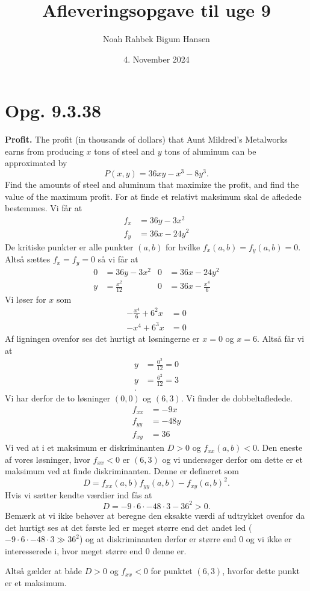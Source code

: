 \documentclass[12pt]{article}
\title{Afleveringsopgave til uge 9}
\author{Noah Rahbek Bigum Hansen}
\date{4. November 2024}
\theoremstyle{definition}
\begin{document}
\maketitle

\section*{Opg. 9.3.38}
\textbf{Profit.} The profit (in thousands of dollars) that Aunt Mildred's Metalworks earns from producing $x$ tons of steel and $y$ tons of aluminum can be approximated by
\[ 
P(x,y) = 36xy - x^3 - 8y^3
.\]
Find the amounts of steel and aluminum that maximize the profit, and find the value of the maximum profit.
\bigbreak
For at finde et relativt maksimum skal de afledede bestemmes. Vi får at
\begin{align*}
  f_{x} &= 36y - 3x^2 \\
  f_y &= 36x - 24y^2
\end{align*}
De kritiske punkter er alle punkter $(a,b)$ for hvilke $f_x(a,b) = f_y(a,b) = 0$. Altså sættes $f_x = f_y = 0$ så vi får at
\begin{align*}
  0 &= 36y - 3x^2 & 0 &= 36x-24y^2 \\
  y &= \frac{x^2}{12} & 0 &= 36x - \frac{x^4}{6} 
\end{align*}
Vi løser for $x$ som
\begin{align*}
  - \frac{x^4}{6} + 6^2x &= 0 \\
  - x^4 + 6^3 x &= 0
\end{align*}
Af ligningen ovenfor ses det hurtigt at løsningerne er $x = 0$ og $x = 6$.
Altså får vi at
\begin{align*}
y &= \frac{0^2}{12} = 0\\
y &= \frac{6^2}{12} = 3 \\
.\end{align*}
Vi har derfor de to løsninger $(0,0)$ og $(6,3)$.
Vi finder de dobbeltafledede.
\begin{align*}
  f_{x x} &= -9x \\
  f_{yy} &= -48y \\
  f_{xy} &= 36
\end{align*}
Vi ved at i et maksimum er diskriminanten $D>0$ og $f_{x x}(a,b) < 0$. Den eneste af vores løsninger, hvor $f_{x x} < 0$ er $(6, 3)$ og vi undersøger derfor om dette er et maksimum ved at finde diskriminanten. Denne er defineret som
\[ 
D = f_{x x}(a,b)f_{yy}(a,b) - f_{xy}(a,b)^2 
.\]
Hvis vi sætter kendte værdier ind fås at
\[ 
D = -9\cdot6\cdot-48\cdot3 - 36^2 > 0
.\]
Bemærk at vi ikke behøver at beregne den eksakte værdi af udtrykket ovenfor da det hurtigt ses at det første led er meget større end det andet led ($-9\cdot6\cdot-48\cdot3 \gg 36^2$) og at diskriminanten derfor er større end 0 og vi ikke er interesserede i, hvor meget større end 0 denne er.

Altså gælder at både $D> 0$ og $f_{x x} < 0$ for punktet $(6,3)$, hvorfor dette punkt er et maksimum.
\end{document}
